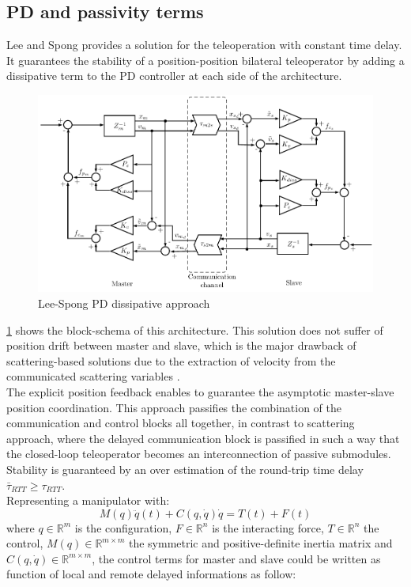 \subsection{PD and passivity terms}
Lee and Spong \cite{Lee2006} provides a solution for the teleoperation with constant time delay. It guarantees the stability of a position-position bilateral teleoperator by adding a dissipative term to the PD controller at each side of the architecture.
\begin{figure}
	\includegraphics[width=\textwidth]{schemas/Lee-spong.pdf}
	\caption[Lee-Spong PD dissipative approach]{Lee-Spong PD dissipative approach }
	\label{sch:Lee_spong}
\end{figure}
 \figurename{ \ref{sch:Lee_spong}} shows the block-schema of this architecture.
This solution does not suffer of position drift between master and slave, which is the major drawback of scattering-based solutions due to the extraction of velocity from the communicated scattering variables \cite{Lee2006}.\\
The explicit position feedback enables to guarantee the asymptotic master-slave position coordination.
This approach passifies the combination of the communication and control blocks all together, in contrast to scattering approach, where the delayed communication block is passified in such a way that the closed-loop teleoperator becomes an interconnection of passive submodules.
Stability is guaranteed by an over estimation of the round-trip time delay $\bar{\tau}_{RTT} \geq \tau_{RTT}$.\\
Representing a manipulator with:
\begin{equation}
	M(q)\ddot{q}(t) + C(q,\dot{q})\dot{q} = T(t) + F(t)
\end{equation}
where $q \in \mathbb{R}^m$ is the configuration, $F \in \mathbb{R}^n$ is the interacting force, $T \in \mathbb{R}^n$ the control, $M(q)  \in \mathbb{R}^{m\times m}$ the symmetric and positive-definite inertia matrix and $C(q,\dot{q}) \in \mathbb{R}^{m \times m} $, the control terms for master and slave could be written as function of local and remote delayed informations as follow:
